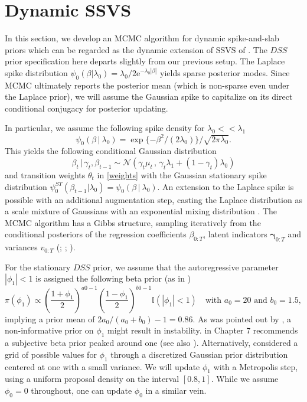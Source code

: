 \documentclass[ba]{imsart}
\numberwithin{equation}{section}
\theoremstyle{plain}
\newcommand{\bm}[1]{\boldsymbol{#1}}
\def\C {\,|\:}
\def\C {\,|\:}
\def\bg{\bm{\gamma}}
\newcommand{\e}{\mathrm{e}}
\begin{document}
{
\section{Dynamic SSVS}\label{sec:dynamic_SSVS}
In this section, we develop an MCMC algorithm   for dynamic spike-and-slab priors which can be regarded as the dynamic extension of SSVS of \cite{GM93}. The $DSS$ prior  specification  here departs slightly from our previous setup.
The Laplace spike distribution $\psi_0(\beta|\lambda_0)=\lambda_0/2\e^{-\lambda_0|\beta|}$ yields sparse posterior modes.
Since MCMC   ultimately reports the posterior mean (which is non-sparse even under the Laplace prior), we will  assume the Gaussian spike to capitalize on its direct conditional conjugacy for posterior updating. 
{In particular, we assume the following spike density  for $\lambda_0<<\lambda_1$
\begin{equation}\label{spike_gaussian}
	\psi_0(\beta\C \lambda_0) =\exp\{-\beta^2/(2\lambda_0)\}/\sqrt{2\pi\lambda_0}.
\end{equation}
This yields the following conditional Gaussian distribution
$$
\beta_t\,|\,\gamma_t,\beta_{t-1}\sim\mathcal{N}\left( \gamma_t\mu_t\,,\, \gamma_t\lambda_1+(1-\gamma_t)\lambda_0\right)
$$
and   transition weights $\theta_t$  in \eqref{weights} with the Gaussian stationary spike distribution $\psi_0^{ST}(\beta_{t-1}|\lambda_0)=\psi_0(\beta\C \lambda_0)$.
An extension to the Laplace spike is possible with an additional augmentation step, casting the Laplace distribution as a scale mixture of Gaussians with an exponential mixing distribution \citep{casella}.
The MCMC algorithm has a Gibbs structure, sampling iteratively from the conditional posteriors of the regression coefficients $\beta_{0:T}$,  latent indicators $\bg_{0:T}$ and variances $v_{0:T}$ (\citealt{Schnatter1994}; \citealt[][Sect 15.2]{WestHarrison1997book2}; \citealt[][Sect 4.5]{Prado2010}).

For the stationary $DSS$ prior, we assume that the autoregressive parameter $|\phi_1|<1$ is assigned the following beta prior (as in \citep{kim_etal})
\begin{equation}\label{beta_prior}
\pi(\phi_1)\propto \left(\frac{1+\phi_1}{2}\right)^{a0-1} \left(\frac{1-\phi_1}{2}\right)^{b0-1}\mathbb{I}(|\phi_1|<1)\quad\text{with $a_0=20$ and $b_0=1.5$},
\end{equation}
implying a prior mean of $2a_0/(a_0+b_0)-1=0.86$.  As was pointed out by  \cite{phillips},   a non-informative prior on $\phi_1$ might result in instability.
\cite{zellner_book} in Chapter 7 recommends a subjective beta prior peaked around one (see also  \cite{kastner_var,Nakajima2010}).
Alternatively, \cite{lopes_mcc_tsay} considered a grid of possible values for $\phi_1$ through a discretized  Gaussian prior distribution centered at one with a small variance. 
We will update $\phi_1$ with a Metropolis step, using a uniform proposal density on the interval $[0.8,1]$. While we assume $\phi_0=0$ throughout, one can update $\phi_0$  in a similar vein.



}}
\end{document}
